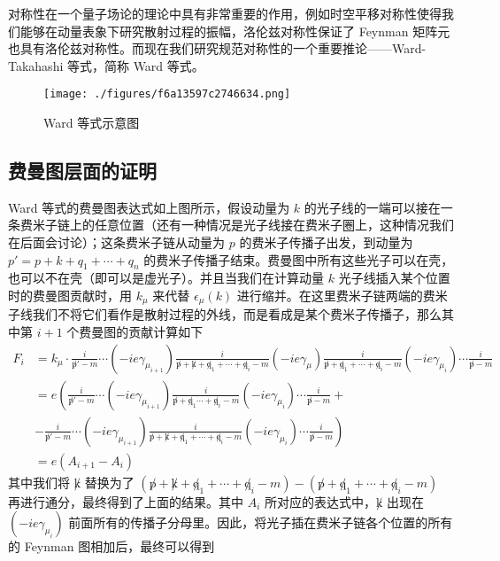 对称性在一个量子场论的理论中具有非常重要的作用，例如时空平移对称性使得我们能够在动量表象下研究散射过程的振幅，洛伦兹对称性保证了 Feynman 矩阵元也具有洛伦兹对称性。而现在我们研究规范对称性的一个重要推论——Ward-Takahashi 等式，简称 Ward 等式。

\begin{figure}[ht]
\centering
\texttt{[image: ./figures/f6a13597c2746634.png]}
\caption{Ward 等式示意图} \label{fig_ward_4}
\end{figure}

\subsection{费曼图层面的证明}
Ward 等式的费曼图表达式如上图所示，假设动量为 $k$ 的光子线的一端可以接在一条费米子链上的任意位置（还有一种情况是光子线接在费米子圈上，这种情况我们在后面会讨论）；这条费米子链从动量为 $p$ 的费米子传播子出发，到动量为 $p'=p+k+q_1+\cdots+q_n$ 的费米子传播子结束。费曼图中所有这些光子可以在壳，也可以不在壳（即可以是虚光子）。并且当我们在计算动量 $k$ 光子线插入某个位置时的费曼图贡献时，用 $k_\mu$ 来代替 $\epsilon_\mu(k)$ 进行缩并。在这里费米子链两端的费米子线我们不将它们看作是散射过程的外线，而是看成是某个费米子传播子，那么其中第 $i+1$ 个费曼图的贡献计算如下
\begin{equation}
\begin{aligned}
F_i&=k_\mu\cdot \frac{i}{\not p'-m}\cdots (-ie\gamma_{\mu_{i+1}})\frac{i}{\not p+\not k+\not q_1+\cdots+\not q_i-m}
(-ie\gamma_\mu)
\frac{i}{\not p+\not q_1+\cdots+\not q_i - m}(-ie\gamma_{\mu_i})\cdots \frac{i}{\not p - m}
\\
&=
e\left(\frac{i}{\not p'-m}\cdots(-ie\gamma_{\mu_{i+1}})\frac{i}{\not p+\not q_1\cdots + \not q_i - m}(-ie\gamma_{\mu_i})\cdots \frac{i}{\not p-m}+\right.\\
&-\left.\frac{i}{\not p'-m}\cdots(-ie\gamma_{\mu_{i+1}})\frac{i}{\not p+\not k+\not q_1+\cdots + \not q_i-m}(-ie\gamma_{\mu_i}) \cdots \frac{i}{\not p-m}\right)
\\
&=e(A_{i+1}-A_i)
\end{aligned}
\end{equation}
其中我们将 $\not k$ 替换为了 $(\not p+\not k+\not q_1+\cdots + \not q_i-m) - (\not p+\not q_1+\cdots + \not q_i-m)$ 再进行通分，最终得到了上面的结果。其中 $A_i$ 所对应的表达式中，$\not k$ 出现在 $(-ie\gamma_{\mu_{i}})$ 前面所有的传播子分母里。因此，将光子插在费米子链各个位置的所有的 Feynman 图相加后，最终可以得到

